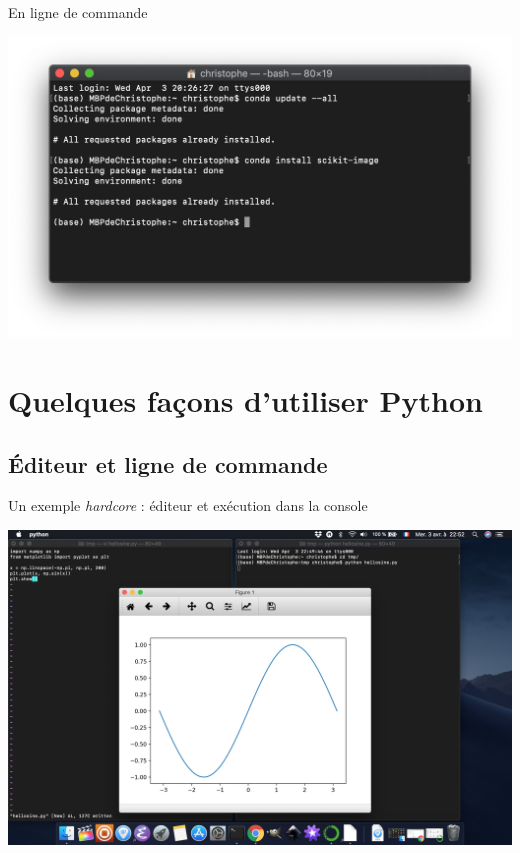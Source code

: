 \documentclass[10pt,aspectratio=169]{beamer}
\begin{document}
\begin{frame}{En ligne de commande}
  \begin{center}
    \includegraphics[height = .8\textheight]{conda-console-upgrade-install}
  \end{center}
\end{frame}

\section{Quelques façons d'utiliser Python}

\subsection{Éditeur et ligne de commande}

\begin{frame}{Un exemple \emph{hardcore} : éditeur et exécution dans la console}
  \begin{center}
    \includegraphics[height = .8\textheight]{vi-console-hellosine}
  \end{center}
\end{frame}
\end{document}
